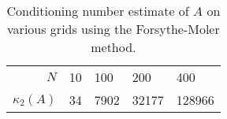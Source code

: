 
\begin{table}[H]
\caption{Conditioning number estimate of $A$ on various grids using the Forsythe-Moler method.}
\label{tab:cond}
\centering
\begin{tabular}{@{}r llll @{}}
    \toprule
    $N$ & 10 & 100 & 200 & 400\\
    $\kappa_2(A)$ & 34 & 7902 & 32177 & 128966 \\
    \bottomrule
\end{tabular}
\end{table}
